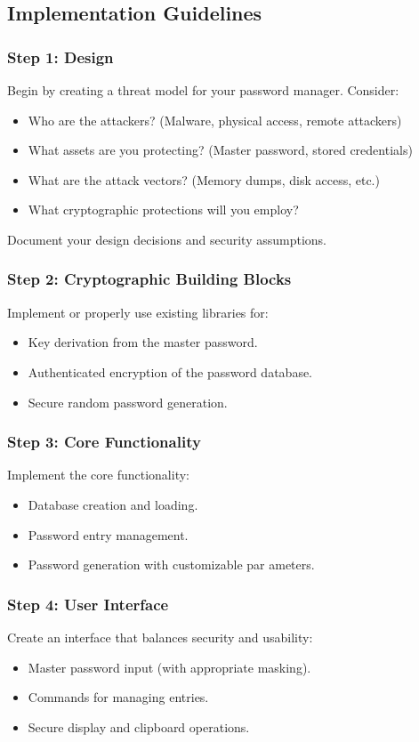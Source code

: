 \documentclass[10pt,a4paper,american]{exam}
\begin{document}
\subsection*{Implementation Guidelines}

\subsubsection*{Step 1: Design}
Begin by creating a threat model for your password manager. Consider:
\begin{itemize}
	\item Who are the attackers? (Malware, physical access, remote attackers)
	\item What assets are you protecting? (Master password, stored credentials)
	\item What are the attack vectors? (Memory dumps, disk access, etc.)
	\item What cryptographic protections will you employ?
\end{itemize}

Document your design decisions and security assumptions.

\subsubsection*{Step 2: Cryptographic Building Blocks}
Implement or properly use existing libraries for:
\begin{itemize}
	\item Key derivation from the master password.
	\item Authenticated encryption of the password database.
	\item Secure random password generation.
\end{itemize}

\subsubsection*{Step 3: Core Functionality}
Implement the core functionality:
\begin{itemize}
	\item Database creation and loading.
	\item Password entry management.
	\item Password generation with customizable par ameters.
\end{itemize}

\subsubsection*{Step 4: User Interface}
Create an interface that balances security and usability:
\begin{itemize}
	\item Master password input (with appropriate masking).
	\item Commands for managing entries.
	\item Secure display and clipboard operations.
\end{itemize}
\end{document}
